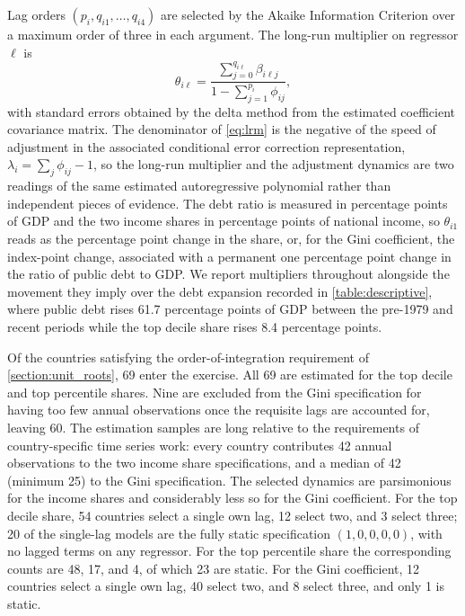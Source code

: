 \documentclass[12pt, titlepage]{article}
\numberwithin{equation}{section}
\begin{document}
Lag orders $(p_{i}, q_{i1}, \dots, q_{i4})$ are selected by the Akaike
Information Criterion over a maximum order of three in each argument. The
long-run multiplier on regressor $\ell$ is
\begin{equation}
	\theta_{i\ell} = \frac{\sum_{j=0}^{q_{i\ell}} \beta_{i\ell j}}
	{1 - \sum_{j=1}^{p_{i}} \phi_{ij}},
	\label{eq:lrm}
\end{equation}
with standard errors obtained by the delta method from the estimated
coefficient covariance matrix. The denominator of \eqref{eq:lrm} is the
negative of the speed of adjustment in the associated conditional error
correction representation, $\lambda_{i} = \sum_{j} \phi_{ij} - 1$, so the
long-run multiplier and the adjustment dynamics are two readings of the same
estimated autoregressive polynomial rather than independent pieces of
evidence. The debt ratio is measured in percentage points of GDP and the two
income shares in percentage points of national income, so $\theta_{i1}$ reads
as the percentage point change in the share, or, for the Gini coefficient, the
index-point change, associated with a permanent one percentage point change in
the ratio of public debt to GDP. We report multipliers throughout alongside
the movement they imply over the debt expansion recorded in
\autoref{table:descriptive}, where public debt rises 61.7 percentage points of
GDP between the pre-1979 and recent periods while the top decile share rises
8.4 percentage points.

Of the countries satisfying the order-of-integration requirement of
\autoref{section:unit_roots}, 69 enter the exercise. All 69 are estimated for
the top decile and top percentile shares. Nine are excluded from the Gini
specification for having too few annual observations once the requisite lags
are accounted for, leaving 60. The estimation samples are long relative to the
requirements of country-specific time series work: every country contributes
42 annual observations to the two income share specifications, and a median of
42 (minimum 25) to the Gini specification. The selected dynamics are
parsimonious for the income shares and considerably less so for the Gini
coefficient. For the top decile share, 54 countries select a single own lag,
12 select two, and 3 select three; 20 of the single-lag models are the fully
static specification $(1,0,0,0,0)$, with no lagged terms on any regressor. For
the top percentile share the corresponding counts are 48, 17, and 4, of which
23 are static. For the Gini coefficient, 12 countries select a single own lag,
40 select two, and 8 select three, and only 1 is static.
\end{document}
